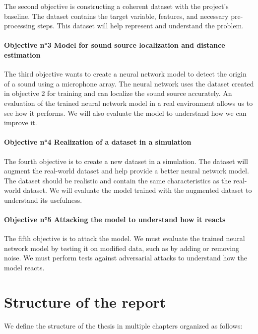 The second objective is constructing a coherent dataset with the project's baseline. The dataset contains the target variable, features, and necessary pre-processing steps. This dataset will help represent and understand the problem.

\paragraph{Objective n°3 Model for sound source localization and distance estimation}
\label{intro:objective3}

The third objective wants to create a neural network model to detect the origin of a sound using a microphone array. The neural network uses the dataset created in objective 2 for training and can localize the sound source accurately. An evaluation of the trained neural network model in a real environment allows us to see how it performs. We will also evaluate the model to understand how we can improve it.

\paragraph{Objective n°4 Realization of a dataset in a simulation}
\label{intro:objective4}

The fourth objective is to create a new dataset in a simulation. The dataset will augment the real-world dataset and help provide a better neural network model. The dataset should be realistic and contain the same characteristics as the real-world dataset. We will evaluate the model trained with the augmented dataset to understand its usefulness.

\paragraph{Objective n°5 Attacking the model to understand how it reacts}
\label{intro:objective5}

The fifth objective is to attack the model. We must evaluate the trained neural network model by testing it on modified data, such as by adding or removing noise. We must perform tests against adversarial attacks to understand how the model reacts.

\section{Structure of the report}
\label{intro:structure}

We define the structure of the thesis in multiple chapters organized as follows:

